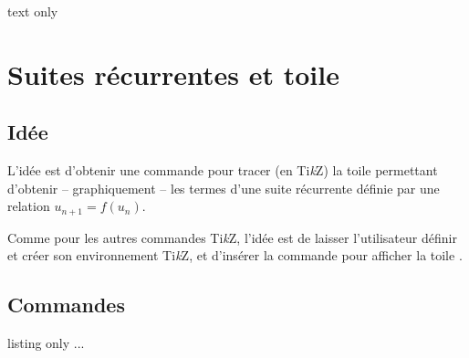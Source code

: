 \documentclass[a4paper,french,11pt]{article}
\providecommand\tikzlogo{Ti\textit{k}Z}
\let\TikZ\tikzlogo
\newcommand\ctex[1]{\tcbox[vignettelatex]{#1}}
\begin{document}
\begin{PresCodeSortiePL}{text only}
\begin{center}
\end{center}
\end{PresCodeSortiePL}

\newpage

\section{Suites récurrentes et \og toile \fg}\label{recurr}

\subsection{Idée}

\begin{tipblock}
L'idée est d'obtenir une commande pour tracer (en \TikZ) la \og toile \fg{} permettant d'obtenir -- graphiquement -- les termes d'une suite récurrente définie par une relation $u_{n+1}=f(u_n)$.

\smallskip

Comme pour les autres commandes \TikZ, l'idée est de laisser l'utilisateur définir et créer son environnement \TikZ, et d'insérer la commande \ctex{ToileRecurrence} pour afficher la \og toile \fg.
\end{tipblock}

\subsection{Commandes}

\begin{PresCodeTexPL}{listing only}
...
\end{PresCodeTexPL}
\end{document}
